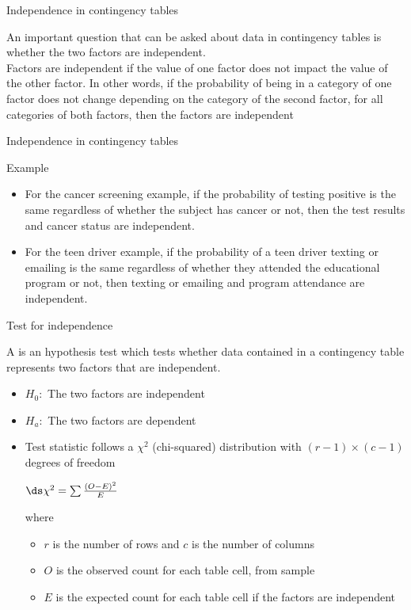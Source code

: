 \documentclass[xcolor=table]{beamer}
\begin{document}
\begin{frame}{Independence in contingency tables}
\begin{block}{}
\large
An important question that can be asked about data in contingency tables is whether the two factors are independent.\\
\pause\medskip
Factors are independent if the value of one factor does not impact the value of the other factor. In other words, if the probability of being in a category of one factor does not change depending on the category of the second factor, for all categories of both factors, then the factors are independent 
\end{block}
\end{frame}

\begin{frame}{Independence in contingency tables}
\begin{exampleblock}{Example}
\large
\begin{itemize}
\item For the cancer screening example, if the probability of testing positive is the same regardless of whether the subject has cancer or not, then the test results and cancer status are independent.

\pause\item For the teen driver example, if the probability of a teen driver texting or emailing is the same regardless of whether they attended the educational program or not, then texting or emailing and program attendance are independent.
\end{itemize}
\end{exampleblock}
\end{frame}

\begin{frame}{Test for independence}
\begin{block}{}
\large
A  is an hypothesis test which tests whether data contained in a contingency table represents two factors that are independent.
\begin{itemize}
\pause\item $H_0:$ The two factors are independent
\pause\item $H_a:$ The two factors are dependent\\
\pause\item Test statistic follows a $\chi^2$ (chi-squared) distribution with $(r-1) \times (c-1)$ degrees of freedom\\
\medskip
{\centering
$\ds \chi^2 = \sum \frac {(O-E)^2}{E}$
\par}
\medskip
where
\begin{itemize}
\item $r$ is the number of rows and $c$ is the number of columns
\item $O$ is the observed count for each table cell, from sample
\item $E$ is the expected count for each table cell if the factors are independent
\end{itemize}
\end{itemize}
\end{block}
\end{frame}
\end{document}
